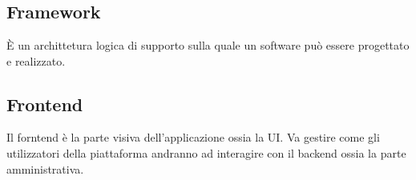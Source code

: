 \section{}
\subsection*{Framework} È un archittetura logica di supporto sulla quale un software può essere progettato e realizzato.
\subsection*{Frontend} Il forntend è la parte visiva dell'applicazione ossia la UI. Va gestire come gli utilizzatori della piattaforma andranno ad interagire con il backend ossia la parte amministrativa.